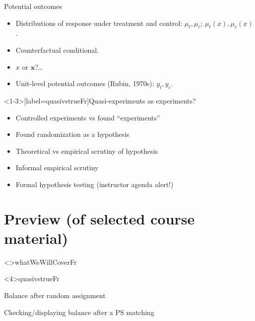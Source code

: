 \begin{frame}{Potential outcomes}
  
  \begin{itemize}[<+->]
  \item Distributions of response under treatment and control: $\mu_{t},
    \mu_{c}$; $\mu_{t}(x), \mu_{c}(x)$.
  \item Counterfactual conditional.
  \item $x$ or $\mathbf{x}$?\ldots
  \item Unit-level potential outcomes (Rubin, 1970s): $y_{t}, y_{c}$.
  \end{itemize}

\end{frame}

\begin{frame}<1-3>[label=quasivstrueFr]{Quasi-experiments as
    experiments?}
  \begin{itemize}[<+->]
  \item Controlled experiments vs found ``experiments''
  \item Found randomization as a hypothesis
  \item Theoretical vs empirical scrutiny of hypothesis
  \item Informal empirical scrutiny
  \item Formal hypothesis testing (instructor agenda alert!)
  \end{itemize}
\end{frame}

\section{Preview (of selected course material)}
\againframe<\nottheirhandout>{whatWeWillCoverFr}

\againframe<4\mynoteonly>{quasivstrueFr}

\begin{frame}{Balance after random assignment}
  \begin{center}
  \end{center}
\end{frame}

\begin{frame}{Checking/displaying balance after a PS matching}
  \begin{center}
  \end{center}
\end{frame}


